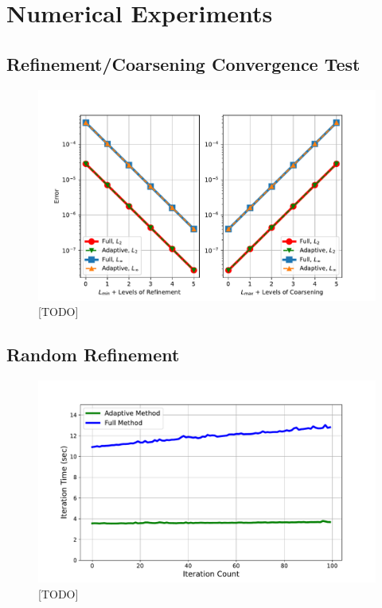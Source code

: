 \section{Numerical Experiments}

\subsection{Refinement/Coarsening Convergence Test}

\begin{figure}
    \centering
    \includegraphics[width=\textwidth, clip=true, trim={40 0 40 40}]{figures/full-vs-adaptive-convergence-no-title.pdf}
    \caption{[TODO]}
    \label{fig:full-vs-adaptive-convergence}
\end{figure}

\subsection{Random Refinement}

\begin{figure}
    \centering
    \includegraphics[width=\textwidth, clip=true, trim={40 0 40 40}]{figures/full-vs-adaptive-time-comparison-no-title.pdf}
    \caption{[TODO]}
    \label{fig:full-vs-adaptive-time-comparison}
\end{figure}

